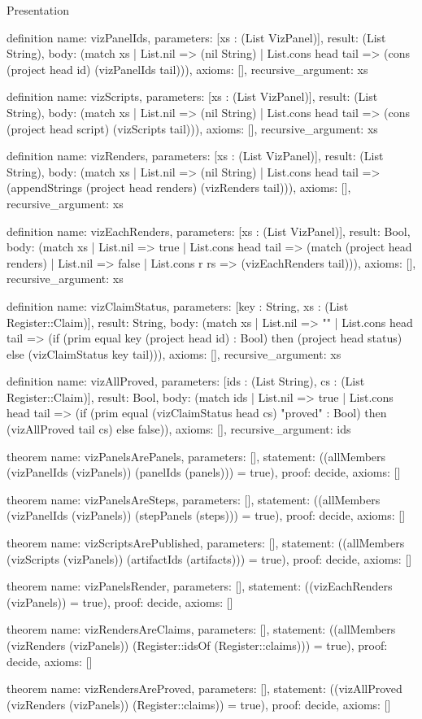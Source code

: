 \begin{lexlean}{Presentation}
\begin{semanticmodule}
definition{
  name: vizPanelIds,
  parameters: [xs : (List VizPanel)],
  result: (List String),
  body: (match xs
    | List.nil => (nil String)
    | List.cons head tail => (cons (project head id) (vizPanelIds tail))),
  axioms: [],
  recursive_argument: xs
}

definition{
  name: vizScripts,
  parameters: [xs : (List VizPanel)],
  result: (List String),
  body: (match xs
    | List.nil => (nil String)
    | List.cons head tail => (cons (project head script) (vizScripts tail))),
  axioms: [],
  recursive_argument: xs
}

definition{
  name: vizRenders,
  parameters: [xs : (List VizPanel)],
  result: (List String),
  body: (match xs
    | List.nil => (nil String)
    | List.cons head tail => (appendStrings (project head renders) (vizRenders tail))),
  axioms: [],
  recursive_argument: xs
}

definition{
  name: vizEachRenders,
  parameters: [xs : (List VizPanel)],
  result: Bool,
  body: (match xs
    | List.nil => true
    | List.cons head tail => (match (project head renders)
    | List.nil => false
    | List.cons r rs => (vizEachRenders tail))),
  axioms: [],
  recursive_argument: xs
}

definition{
  name: vizClaimStatus,
  parameters: [key : String, xs : (List Register::Claim)],
  result: String,
  body: (match xs
    | List.nil => ""
    | List.cons head tail => (if (prim equal key (project head id) : Bool) then (project head status) else (vizClaimStatus key tail))),
  axioms: [],
  recursive_argument: xs
}

definition{
  name: vizAllProved,
  parameters: [ids : (List String), cs : (List Register::Claim)],
  result: Bool,
  body: (match ids
    | List.nil => true
    | List.cons head tail => (if (prim equal (vizClaimStatus head cs) "proved" : Bool) then (vizAllProved tail cs) else false)),
  axioms: [],
  recursive_argument: ids
}

theorem{
  name: vizPanelsArePanels,
  parameters: [],
  statement: ((allMembers (vizPanelIds (vizPanels)) (panelIds (panels))) = true),
  proof: decide{},
  axioms: []
}

theorem{
  name: vizPanelsAreSteps,
  parameters: [],
  statement: ((allMembers (vizPanelIds (vizPanels)) (stepPanels (steps))) = true),
  proof: decide{},
  axioms: []
}

theorem{
  name: vizScriptsArePublished,
  parameters: [],
  statement: ((allMembers (vizScripts (vizPanels)) (artifactIds (artifacts))) = true),
  proof: decide{},
  axioms: []
}

theorem{
  name: vizPanelsRender,
  parameters: [],
  statement: ((vizEachRenders (vizPanels)) = true),
  proof: decide{},
  axioms: []
}

theorem{
  name: vizRendersAreClaims,
  parameters: [],
  statement: ((allMembers (vizRenders (vizPanels)) (Register::idsOf (Register::claims))) = true),
  proof: decide{},
  axioms: []
}

theorem{
  name: vizRendersAreProved,
  parameters: [],
  statement: ((vizAllProved (vizRenders (vizPanels)) (Register::claims)) = true),
  proof: decide{},
  axioms: []
}
\end{semanticmodule}
\end{lexlean}
